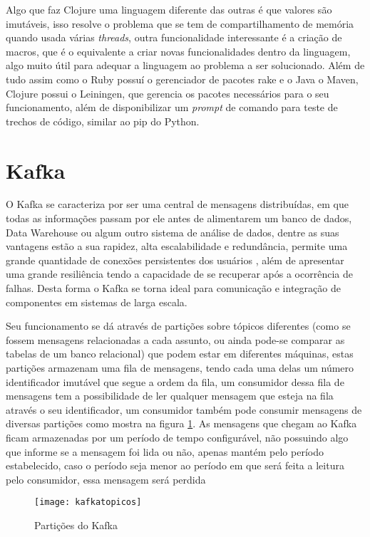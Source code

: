 Algo que faz Clojure uma linguagem diferente das outras é que valores são imutáveis, isso resolve o problema que se tem de compartilhamento de memória quando usada várias \textit{threads}, outra funcionalidade interessante é a criação de macros, que é o equivalente a criar novas funcionalidades dentro da linguagem, algo muito útil para adequar a linguagem ao problema a ser solucionado. Além de tudo assim como o Ruby possuí o gerenciador de pacotes rake e o Java o Maven, Clojure possui o Leiningen, que gerencia os pacotes necessários para o seu funcionamento, além de disponibilizar um \textit{prompt} de comando para teste de trechos de código, similar ao pip do Python.~\cite{hickey2010clojure}

\section{Kafka}
O Kafka se caracteriza por ser uma central de mensagens distribuídas, em que todas as informações passam por ele antes de alimentarem um banco de dados, Data Warehouse ou algum outro sistema de análise de dados, dentre as suas vantagens estão a sua rapidez, alta escalabilidade e redundância, permite uma grande quantidade de conexões persistentes dos usuários , além de apresentar uma grande resiliência tendo a capacidade de se recuperar após a ocorrência de falhas. Desta forma o Kafka se torna ideal para comunicação e integração de componentes em sistemas de larga escala.

Seu funcionamento se dá através de partições sobre tópicos diferentes (como se fossem mensagens relacionadas a cada assunto, ou ainda pode-se comparar as tabelas de um banco relacional) que podem estar em diferentes máquinas, estas partições armazenam uma fila de mensagens, tendo cada uma delas um número identificador imutável que segue a ordem da fila, um consumidor dessa fila de mensagens tem a possibilidade de ler qualquer mensagem que esteja na fila através o seu identificador, um consumidor também pode consumir mensagens de diversas partições como mostra na figura \ref{fig:kafkatopicos}. As mensagens que chegam ao Kafka ficam armazenadas por um período de tempo configurável, não possuindo algo que informe se a mensagem foi lida ou não, apenas mantém pelo período estabelecido, caso o período seja menor ao período em que será feita a leitura pelo consumidor, essa mensagem será perdida

\begin{figure}[!h]
\caption{\label{fig:kafkatopicos} Partições do Kafka}
\begin{center}
\texttt{[image: kafkatopicos]}
\end{center}
\end{figure}

